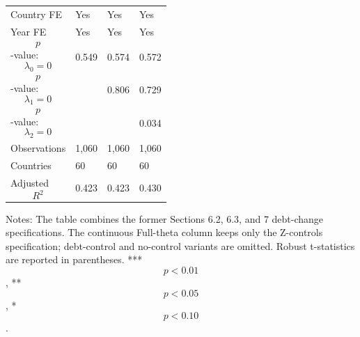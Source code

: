 \begin{table}[H]
\begin{threeparttable}
\begin{tabularx}{\textwidth}{lYYY}
Country FE & Yes & Yes & Yes \\
Year FE & Yes & Yes & Yes \\
$$p$$-value: $$\lambda_0=0$$ & 0.549 & 0.574 & 0.572 \\
$$p$$-value: $$\lambda_1=0$$ &  & 0.806 & 0.729 \\
$$p$$-value: $$\lambda_2=0$$ &  &  & 0.034 \\
Observations & 1,060 & 1,060 & 1,060 \\
Countries & 60 & 60 & 60 \\
Adjusted $$R^2$$ & 0.423 & 0.423 & 0.430 \\
\bottomrule
\end{tabularx}
\begin{tablenotes}[flushleft]\footnotesize
\item Notes: The table combines the former Sections 6.2, 6.3, and 7 debt-change specifications. The continuous Full-theta column keeps only the Z-controls specification; debt-control and no-control variants are omitted. Robust t-statistics are reported in parentheses. *** $$p<0.01$$, ** $$p<0.05$$, * $$p<0.10$$.
\end{tablenotes}
\end{threeparttable}
\end{table}
